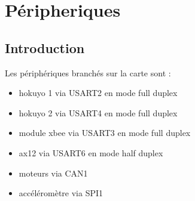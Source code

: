 \chapter{Péripheriques}

\section{Introduction}

Les périphériques branchés sur la carte sont :
\begin{itemize}
\item hokuyo 1 via USART2 en mode full duplex
\item hokuyo 2 via USART4 en mode full duplex
\item module xbee via USART3 en mode full duplex
\item ax12 via USART6 en mode half duplex
\item moteurs via CAN1
\item accéléromètre via SPI1
\end{itemize}

\clearpage
